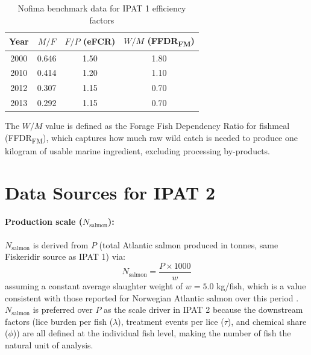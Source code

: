 \documentclass[12pt, a4paper]{report}
\begin{document}
\begin{table}[h]
\centering
\caption{Nofima benchmark data for IPAT 1 efficiency factors}
\begin{tabular}{cccc}
\hline
\textbf{Year} & \textbf{$M/F$} & \textbf{$F/P$ (eFCR)} &
\textbf{$W/M$ (FFDR\textsubscript{FM})} \\
\hline
2000 & 0.646 & 1.50 & 1.80 \\
2010 & 0.414 & 1.20 & 1.10 \\
2012 & 0.307 & 1.15 & 0.70 \\
2013 & 0.292 & 1.15 & 0.70 \\
\hline
\end{tabular}
\label{tab:nofima}
\end{table}

The $W/M$ value is defined as the Forage Fish Dependency Ratio for fishmeal (FFDR\textsubscript{FM}), which captures how much raw wild catch is needed to produce one kilogram of usable marine ingredient, excluding processing by-products.

\section{Data Sources for IPAT 2}

\paragraph{Production scale ($N_{\text{salmon}}$):}
$N_{\text{salmon}}$ is derived from $P$ (total Atlantic salmon 
produced in tonnes, same Fiskeridir source as IPAT 1) via:
\begin{equation}
    N_{\text{salmon}} = \frac{P \times 1000}{w}
\end{equation}
assuming a constant average slaughter weight of $w = 5.0$ kg/fish, 
which is a value consistent with those reported for Norwegian Atlantic salmon over this period \citep{ytrestoeyl2015}. $N_{\text{salmon}}$ is preferred over $P$ as the scale driver in 
IPAT 2 because the downstream factors (lice burden per fish 
($\lambda$), treatment events per lice ($\tau$), and chemical 
share ($\phi$))  are all defined at the individual fish level, 
making the number of fish the natural unit of analysis.
\end{document}
